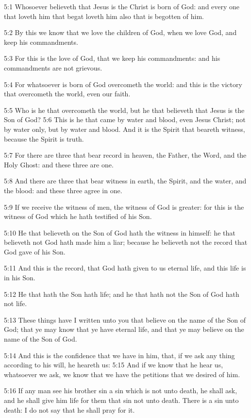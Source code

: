 5:1 Whosoever believeth that Jesus is the Christ is born of God: and
every one that loveth him that begat loveth him also that is begotten
of him.

5:2 By this we know that we love the children of God, when we love
God, and keep his commandments.

5:3 For this is the love of God, that we keep his commandments: and
his commandments are not grievous.

5:4 For whatsoever is born of God overcometh the world: and this is
the victory that overcometh the world, even our faith.

5:5 Who is he that overcometh the world, but he that believeth that
Jesus is the Son of God?  5:6 This is he that came by water and blood,
even Jesus Christ; not by water only, but by water and blood. And it
is the Spirit that beareth witness, because the Spirit is truth.

5:7 For there are three that bear record in heaven, the Father, the
Word, and the Holy Ghost: and these three are one.

5:8 And there are three that bear witness in earth, the Spirit, and
the water, and the blood: and these three agree in one.

5:9 If we receive the witness of men, the witness of God is greater:
for this is the witness of God which he hath testified of his Son.

5:10 He that believeth on the Son of God hath the witness in himself:
he that believeth not God hath made him a liar; because he believeth
not the record that God gave of his Son.

5:11 And this is the record, that God hath given to us eternal life,
and this life is in his Son.

5:12 He that hath the Son hath life; and he that hath not the Son of
God hath not life.

5:13 These things have I written unto you that believe on the name of
the Son of God; that ye may know that ye have eternal life, and that
ye may believe on the name of the Son of God.

5:14 And this is the confidence that we have in him, that, if we ask
any thing according to his will, he heareth us: 5:15 And if we know
that he hear us, whatsoever we ask, we know that we have the petitions
that we desired of him.

5:16 If any man see his brother sin a sin which is not unto death, he
shall ask, and he shall give him life for them that sin not unto
death. There is a sin unto death: I do not say that he shall pray for
it.

